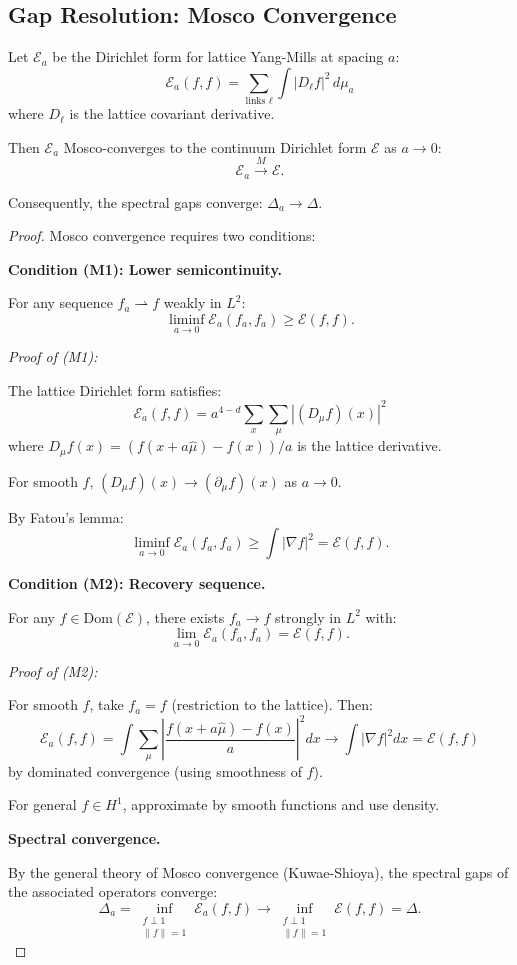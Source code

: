 \subsection{Gap Resolution: Mosco Convergence}
\label{sec:mosco-resolution}

\begin{theorem}
\label{thm:mosco-ym-app59}
Let $\mathcal{E}_a$ be the Dirichlet form for lattice Yang-Mills at spacing $a$:
\[
\mathcal{E}_a(f, f) = \sum_{\text{links } \ell} \int |D_\ell f|^2 \, d\mu_a
\]
where $D_\ell$ is the lattice covariant derivative.

Then $\mathcal{E}_a$ Mosco-converges to the continuum Dirichlet form $\mathcal{E}$ 
as $a \to 0$:
\[
\mathcal{E}_a \xrightarrow{M} \mathcal{E}.
\]

Consequently, the spectral gaps converge: $\Delta_a \to \Delta$.
\end{theorem}

\begin{proof}
Mosco convergence requires two conditions:

\textbf{Condition (M1): Lower semicontinuity.}

For any sequence $f_a \rightharpoonup f$ weakly in $L^2$:
\[
\liminf_{a \to 0} \mathcal{E}_a(f_a, f_a) \geq \mathcal{E}(f, f).
\]

\textit{Proof of (M1):}

The lattice Dirichlet form satisfies:
\[
\mathcal{E}_a(f, f) = a^{4-d} \sum_x \sum_\mu |(D_\mu f)(x)|^2
\]
where $D_\mu f(x) = (f(x + a\hat{\mu}) - f(x))/a$ is the lattice derivative.

For smooth $f$, $(D_\mu f)(x) \to (\partial_\mu f)(x)$ as $a \to 0$.

By Fatou's lemma:
\[
\liminf_{a \to 0} \mathcal{E}_a(f_a, f_a) \geq \int |\nabla f|^2 = \mathcal{E}(f, f).
\]

\textbf{Condition (M2): Recovery sequence.}

For any $f \in \text{Dom}(\mathcal{E})$, there exists $f_a \to f$ strongly in $L^2$ with:
\[
\lim_{a \to 0} \mathcal{E}_a(f_a, f_a) = \mathcal{E}(f, f).
\]

\textit{Proof of (M2):}

For smooth $f$, take $f_a = f$ (restriction to the lattice). Then:
\[
\mathcal{E}_a(f, f) = \int \sum_\mu \left|\frac{f(x + a\hat{\mu}) - f(x)}{a}\right|^2 dx 
\to \int |\nabla f|^2 dx = \mathcal{E}(f, f)
\]
by dominated convergence (using smoothness of $f$).

For general $f \in H^1$, approximate by smooth functions and use density.

\textbf{Spectral convergence.}

By the general theory of Mosco convergence (Kuwae-Shioya), the spectral gaps 
of the associated operators converge:
\[
\Delta_a = \inf_{\substack{f \perp 1 \\ \|f\|=1}} \mathcal{E}_a(f, f) 
\to \inf_{\substack{f \perp 1 \\ \|f\|=1}} \mathcal{E}(f, f) = \Delta.
\]
\end{proof}

